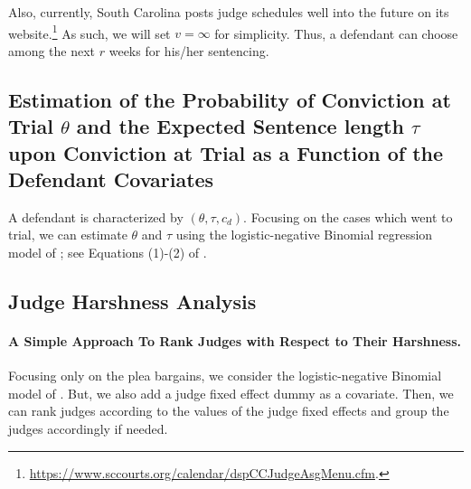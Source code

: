 \documentclass[11pt, oneside]{article}   	%
\theoremstyle{ModifiedStyle}
\begin{document}
Also, currently, South Carolina posts judge schedules well into the future on its website.\footnote{\url{https://www.sccourts.org/calendar/dspCCJudgeAsgMenu.cfm}.} As such, we will set $v=\infty$ for simplicity. Thus, a defendant can choose among the next $r$ weeks for his/her sentencing.

\subsection{Estimation of the Probability of Conviction at Trial $\theta$ and the Expected Sentence length $\tau$ upon Conviction at Trial as a Function of the Defendant Covariates}
\label{Sec:Estimation:Probability_Of_Conviction_And_Sentence_Length}
A defendant is characterized by $(\theta,\tau,c_d)$. Focusing on the cases which went to trial, we can estimate $\theta$ and $\tau$ using the logistic-negative Binomial regression model of \citet{Hester_Hartman_2017}; see Equations (1)-(2) of \citet{Hester_Hartman_2017}.

\subsection{Judge Harshness Analysis}
\label{Sec:Judge_Harshness_Analysis}

\vspace{-3mm}
\paragraph{A Simple Approach To Rank Judges with Respect to Their Harshness.} Focusing only on the plea bargains, we consider the logistic-negative Binomial model of \citet{Hester_Hartman_2017}. But, we also add a judge fixed effect dummy as a covariate. Then, we can rank judges according to the values of the judge fixed effects and group the judges accordingly if needed.
%
\vspace{-3mm}
\end{document}
